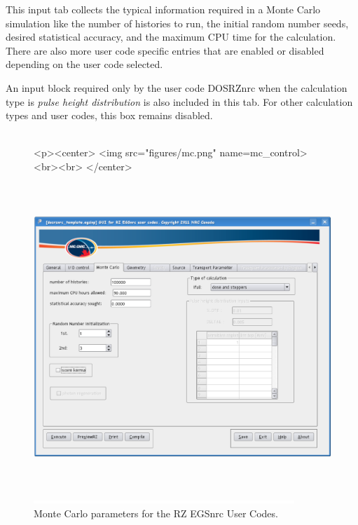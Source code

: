 \documentclass[12pt,twoside]{article}   %
\begin{document}
This input tab collects the typical information required in a Monte Carlo simulation like
the number of histories to run, the initial random number seeds, desired statistical accuracy,
and the maximum CPU time for the calculation. There are also more user code specific entries
that are enabled or disabled depending on the user code selected.

An input block required only by the user code DOSRZnrc when the calculation type is
{\em pulse height distribution} is also included in this tab. For other calculation types and user codes,
this box remains disabled. \\ \\


\begin{figure}[htb]
\begin{htmlonly}
\begin{rawhtml}
<p><center>
<img src="figures/mc.png" name=mc_control><br><br>
</center>
\end{rawhtml}
\end{htmlonly}
\begin{latexonly}
\begin{center}
\includegraphics[height=11.56cm]{figures/mc}
\end{center}
\end{latexonly}
\begin{center}
\includegraphics[height=1mm]{figures/fake2}
\end{center}
\caption{Monte Carlo parameters for the RZ EGSnrc User Codes.}
\label{mc_control}
\end{figure}
\end{document}
